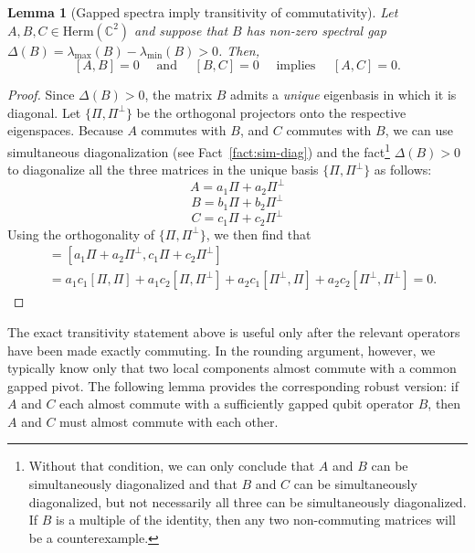 \documentclass[a4paper,onecolumn,11pt]{quantumarticle}
\theoremstyle{plain}
\newtheorem{lemma}[theorem]{Lemma}
\begin{document}
\begin{lemma}[Gapped spectra imply transitivity of commutativity]\label{lem:transitivity}
Let $A,B,C \in \mathrm{Herm}(\mathbb{C}^{2})$ and suppose that $B$ has non-zero spectral gap $\Delta(B)=\lambda_{\max}(B) - \lambda_{\min}(B) > 0$. Then, 
$$
[A,B] = 0 \quad \text{ and } \quad [B,C] = 0 \quad \text{ implies } \quad [A,C]=0.
$$
\end{lemma}
\begin{proof}
Since $\Delta(B) > 0$, the matrix $B$ admits a \emph{unique} eigenbasis in which it is diagonal. Let $\{\Pi, \Pi^\perp\}$ be the orthogonal projectors onto the respective eigenspaces.
Because $A$ commutes with $B$, and $C$ commutes with $B$, we can use simultaneous diagonalization (see Fact~\ref{fact:sim-diag}) and the fact\footnote{Without that condition, we can only conclude that $A$ and $B$ can be simultaneously diagonalized and that $B$ and $C$ can be simultaneously diagonalized, but not necessarily all three can be simultaneously diagonalized. If $B$ is a multiple of the identity, then any two non-commuting matrices will be a counterexample.} $\Delta(B) > 0$ to diagonalize all the three matrices in the unique basis $\{\Pi, \Pi^\perp\}$ as follows:
\begin{equation}
    A = a_1 \Pi + a_2 \Pi^\bot
\end{equation}
\begin{equation}
    B = b_1 \Pi + b_2 \Pi^\bot
\end{equation}
\begin{equation}
    C = c_1 \Pi + c_2 \Pi^\bot
\end{equation}
Using the orthogonality of $\{\Pi, \Pi^\perp\}$, we then find that
\begin{align*}
    [A, C] &= \left[a_1 \Pi + a_2 \Pi^\bot,  c_1 \Pi + c_2 \Pi^\bot\right]\\
    &= a_1c_1 [\Pi, \Pi] + a_1 c_2 [\Pi, \Pi^\bot] + a_2 c_1 [\Pi^\bot, \Pi] + a_2 c_2 [\Pi^\bot, \Pi^\bot] = 0.
\end{align*}
\end{proof}

The exact transitivity statement above is useful only after the relevant
operators have been made exactly commuting.  In the rounding argument,
however, we typically know only that two local components almost commute
with a common gapped pivot.  The following lemma provides the corresponding
robust version: if $A$ and $C$ each almost commute with a sufficiently
gapped qubit operator $B$, then $A$ and $C$ must almost commute with each
other. 
\end{document}
